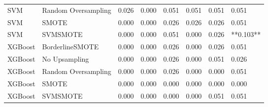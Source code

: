 \begin{tabular}{llllllll}
                         SVM & Random Oversampling & 0.026 &                     0.000 &                 0.051 &                  0.051 &                                   0.051 &     0.051 \\
                         SVM &               SMOTE & 0.000 &                     0.000 &                 0.026 &                  0.026 &                                   0.026 &     0.051 \\
                         SVM &            SVMSMOTE & 0.000 &                     0.000 &                 0.051 &                  0.000 &                                   0.026 & **0.103** \\
                     XGBoost &     BorderlineSMOTE & 0.000 &                     0.000 &                 0.026 &                  0.000 &                                   0.026 &     0.051 \\
                     XGBoost &       No Upsampling & 0.000 &                     0.000 &                 0.026 &                  0.000 &                                   0.051 &     0.026 \\
                     XGBoost & Random Oversampling & 0.000 &                     0.000 &                 0.026 &                  0.000 &                                   0.000 &     0.051 \\
                     XGBoost &               SMOTE & 0.000 &                     0.000 &                 0.000 &                  0.000 &                                   0.000 &     0.000 \\
                     XGBoost &            SVMSMOTE & 0.000 &                     0.000 &                 0.000 &                  0.000 &                                   0.051 &     0.051 \\
\bottomrule
\end{tabular}

